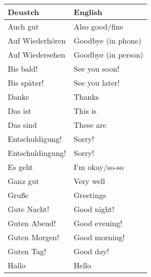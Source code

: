 \documentclass{article}
\renewcommand{\arraystretch}{1}
\begin{document}
\begin{minipage}{0.48\textwidth}
    \centering
    \renewcommand{\arraystretch}{1.5}
    \begin{tabular}{|>{\raggedright\arraybackslash}p{3.5cm}|>{\raggedright\arraybackslash}p{3.5cm}|}
        \hline
        \rowcolor{gray!20} \textbf{Deustch} & \textbf{English} \\
        \hline
        Auch gut & Also good/fine \\\hline
        Auf Wiederhören & Goodbye (in phone) \\\hline
        Auf Wiedersehen & Goodbye (in person) \\\hline
        Bis bald! & See you soon! \\\hline
        Bis später! & See you later! \\\hline
        Danke &  Thanks \\\hline
        Das ist &  This is \\\hline
        Das sind &  These are \\\hline
        Entschuldigung! & Sorry! \\\hline
        Entschuldingung! & Sorry! \\\hline
        Es geht & I'm okay/so-so \\\hline
        Ganz gut & Very well \\\hline
        Gru\ss{}e & Greetings \\\hline
        Gute Nacht! &  Good night! \\\hline
        Guten Abend! &  Good evening! \\\hline
        Guten Morgen! &  Good morning! \\\hline
        Guten Tag! &  Good day! \\\hline
        Hallo & Hello \\\hline
    \end{tabular}
\end{minipage}%
\hfill
\end{document}
